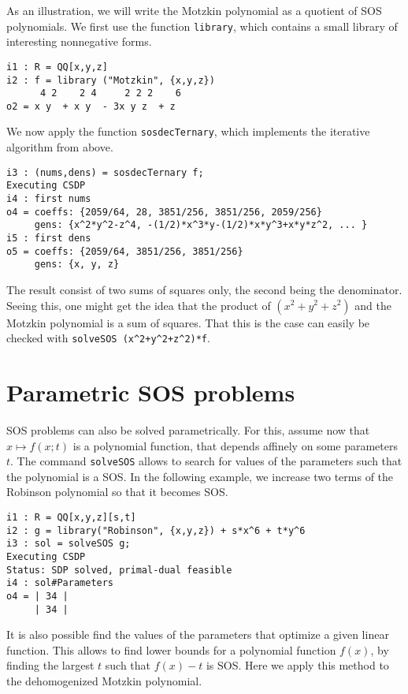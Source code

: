 \documentclass[11pt]{amsart}
\theoremstyle{plain}%
\theoremstyle{definition}
\theoremstyle{remark}
\begin{document}
As an illustration, we will write the Motzkin polynomial as a quotient of SOS polynomials.
We first use the function \verb|library|, which contains a small library of interesting nonnegative forms.
{\small
\begin{verbatim}
i1 : R = QQ[x,y,z]
i2 : f = library ("Motzkin", {x,y,z})
      4 2    2 4     2 2 2    6
o2 = x y  + x y  - 3x y z  + z
\end{verbatim}
}

\noindent 
We now apply the function \verb|sosdecTernary|, which implements the iterative algorithm from above.
{\small
\begin{verbatim}
i3 : (nums,dens) = sosdecTernary f;
Executing CSDP
i4 : first nums
o4 = coeffs: {2059/64, 28, 3851/256, 3851/256, 2059/256}
     gens: {x^2*y^2-z^4, -(1/2)*x^3*y-(1/2)*x*y^3+x*y*z^2, ... }
i5 : first dens
o5 = coeffs: {2059/64, 3851/256, 3851/256}
     gens: {x, y, z}
\end{verbatim}
}

The result consist of two sums of squares only, the second being the denominator.
Seeing this, one might get the idea that the product of $(x^{2}+y^{2}+z^{2})$ and the Motzkin polynomial is a sum of squares.
That this is the case can easily be checked with \verb|solveSOS (x^2+y^2+z^2)*f|.

\section{Parametric SOS problems}

SOS problems can also be solved parametrically.
For this, assume now that $x \mapsto f(x;t)$ is a polynomial function, that depends affinely on some parameters~$t$.
The command \verb|solveSOS| allows to search for values of the parameters such that the polynomial is a SOS.
In the following example, we increase two terms of the Robinson polynomial so that it becomes SOS.

{\small
\begin{verbatim}
i1 : R = QQ[x,y,z][s,t]
i2 : g = library("Robinson", {x,y,z}) + s*x^6 + t*y^6
i3 : sol = solveSOS g;
Executing CSDP
Status: SDP solved, primal-dual feasible
i4 : sol#Parameters
o4 = | 34 |
     | 34 |
\end{verbatim}
}

It is also possible find the values of the parameters that optimize a given linear function.
This allows to find lower bounds for a polynomial function $f(x)$,
by finding the largest $t$ such that $f(x)-t$ is SOS.
Here we apply this method to the dehomogenized Motzkin polynomial.
\end{document}
